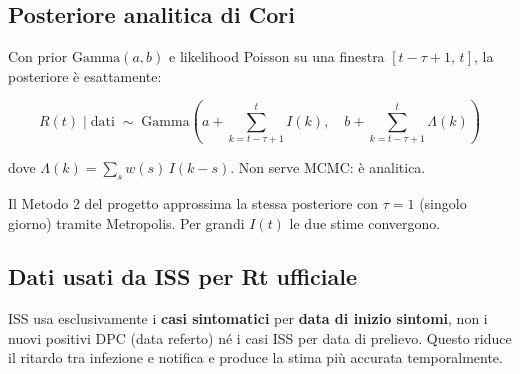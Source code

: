 \documentclass[12pt, a4paper]{article}
\begin{document}
\subsection{Posteriore analitica di Cori}

Con prior $\mathrm{Gamma}(a, b)$ e likelihood Poisson su una finestra
$[t-\tau+1,\, t]$, la posteriore è esattamente:

\begin{equation}
    R(t)\mid\text{dati}
    \;\sim\;
    \mathrm{Gamma}\!\left(
        a + \sum_{k=t-\tau+1}^{t} I(k),\quad
        b + \sum_{k=t-\tau+1}^{t} \Lambda(k)
    \right)
\end{equation}

dove $\Lambda(k) = \sum_s w(s)\, I(k-s)$. Non serve MCMC: è analitica.

Il Metodo 2 del progetto approssima la stessa posteriore con $\tau=1$
(singolo giorno) tramite Metropolis. Per grandi $I(t)$ le due stime
convergono.

\subsection{Dati usati da ISS per Rt ufficiale}

ISS usa esclusivamente i \textbf{casi sintomatici} per \textbf{data di inizio
sintomi}, non i nuovi positivi DPC (data referto) né i casi ISS per data di
prelievo. Questo riduce il ritardo tra infezione e notifica e produce la stima
più accurata temporalmente.
\end{document}
